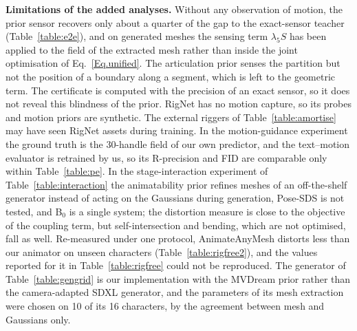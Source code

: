 \documentclass[lettersize,journal]{IEEEtran}
\newenvironment{revblock}{\par\color{red}}{\par}
\begin{document}
\begin{revblock}
\textbf{Limitations of the added analyses.} Without any observation of motion, the
prior sensor recovers only about a quarter of the gap to the exact-sensor teacher
(Table~\ref{table:e2e}), and on generated meshes the sensing term $\lambda_{5}S$ has been applied to the
field of the extracted mesh rather than inside the joint optimisation of Eq.~\ref{Eq.unified}. The articulation prior senses the partition but not
the position of a boundary along a segment, which is left to the geometric term. The certificate
is computed with the precision of an exact sensor, so it does not reveal this blindness of the
prior. RigNet has no motion capture, so its probes and motion priors are synthetic. The external
riggers of Table~\ref{table:amortise} may have seen RigNet assets during training. In the
motion-guidance experiment the ground truth is the 30-handle field of our own predictor, and the
text--motion evaluator is retrained by us, so its R-precision and FID are comparable only within
Table~\ref{table:pe}. In the stage-interaction experiment of Table~\ref{table:interaction} the
animatability prior refines meshes of an off-the-shelf generator instead of acting on the
Gaussians during generation, Pose-SDS is not tested, and B$_{0}$ is a single system; the
distortion measure is close to the objective of the coupling term, but self-intersection and
bending, which are not optimised, fall as well. Re-measured under one protocol, AnimateAnyMesh distorts less
than our animator on unseen characters (Table~\ref{table:rigfree2}), and the values reported for
it in Table~\ref{table:rigfree} could not be reproduced. The generator of Table~\ref{table:gengrid} is our implementation with the MVDream prior rather than the camera-adapted SDXL generator, and the parameters of its mesh extraction were chosen on 10 of its 16 characters, by the agreement between mesh and Gaussians only.
\end{revblock}
\end{document}
